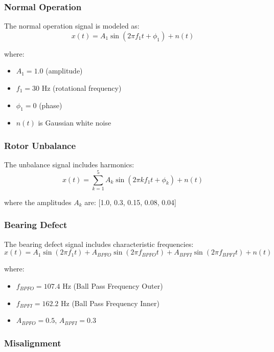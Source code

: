 \subsubsection{Normal Operation}

The normal operation signal is modeled as:
\begin{equation}
x(t) = A_1 \sin(2\pi f_1 t + \phi_1) + n(t)
\end{equation}

where:
\begin{itemize}
    \item $A_1 = 1.0$ (amplitude)
    \item $f_1 = 30$ Hz (rotational frequency)
    \item $\phi_1 = 0$ (phase)
    \item $n(t)$ is Gaussian white noise
\end{itemize}

\subsubsection{Rotor Unbalance}

The unbalance signal includes harmonics:
\begin{equation}
x(t) = \sum_{k=1}^{5} A_k \sin(2\pi k f_1 t + \phi_k) + n(t)
\end{equation}

where the amplitudes $A_k$ are: [1.0, 0.3, 0.15, 0.08, 0.04]

\subsubsection{Bearing Defect}

The bearing defect signal includes characteristic frequencies:
\begin{equation}
x(t) = A_1 \sin(2\pi f_1 t) + A_{BPFO} \sin(2\pi f_{BPFO} t) + A_{BPFI} \sin(2\pi f_{BPFI} t) + n(t)
\end{equation}

where:
\begin{itemize}
    \item $f_{BPFO} = 107.4$ Hz (Ball Pass Frequency Outer)
    \item $f_{BPFI} = 162.2$ Hz (Ball Pass Frequency Inner)
    \item $A_{BPFO} = 0.5$, $A_{BPFI} = 0.3$
\end{itemize}

\subsubsection{Misalignment}

